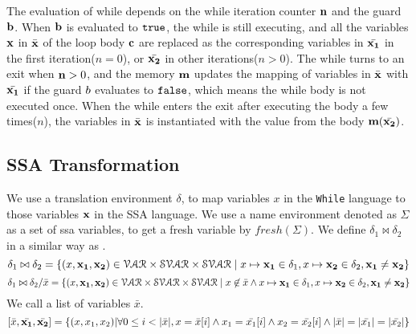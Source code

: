 \documentclass[a4paper,11pt]{article}
\begin{document}
{
	The evaluation of while depends on the while iteration counter $\boldsymbol{\mathbf{n}}$ and the guard $\boldsymbol{\mathbf{b}}$. 
	When $\boldsymbol{\mathbf{b}}$ is evaluated to $\mathtt{true}$, the while is still executing, and all the variables $\boldsymbol{\mathbf{x}}$ in $\bar{\boldsymbol{\mathbf{x}}}$ of the loop body $\boldsymbol{\mathbf{c}}$ are replaced as the corresponding variables in $\bar{\boldsymbol{\mathbf{x_1}}}$ in the first iteration($n=0$), or $\bar{\boldsymbol{\mathbf{x_2}}}$ in other iterations($n > 0$). 
	The while turns to an exit when $\boldsymbol{\mathbf{n}} > 0$, 
	and the memory $\boldsymbol{\mathbf{m}}$ updates the mapping of variables in $\bar{\boldsymbol{\mathbf{x}}}$ with $\bar{\boldsymbol{\mathbf{x_1}}}$ if the guard $b$ evaluates to $\mathtt{false}$, 
	which means the while body is not executed once. 
	When the while enters the exit after executing the body a few times($n$), the variables in $\bar{\boldsymbol{\mathbf{x}}}$ is instantiated with the value from the body $\boldsymbol{\mathbf{m}}(\bar{\boldsymbol{\mathbf{x_2}}})$. 
}
%
%
\subsection{SSA Transformation}
We use a translation environment $\delta$, to map variables $x$ in the {\tt While} language to those variables $\boldsymbol{\mathbf{x}}$ in the SSA language.
We use a name environment denoted as $\Sigma$ as a set of ssa variables, to get a fresh variable by $fresh(\Sigma)$. 
We define $\delta_1 \bowtie \delta_2 $ in a similar way as
\cite{vekris2016refinement}.
%
\[ 
\delta_1 \bowtie \delta_2 = \{ ( x, {\boldsymbol{\mathbf{x_1}}, \boldsymbol{\mathbf{x_2}}} ) \in 
\mathcal{VAR} \times \mathcal{SVAR} \times \mathcal{SVAR} \mid x \mapsto {\boldsymbol{\mathbf{x_1}}} \in \delta_1 , x \mapsto {\boldsymbol{\mathbf{x_2}} } \in \delta_2, {\boldsymbol{\mathbf{x_1}} \not= {\boldsymbol{\mathbf{x_2}} }  }  \} 
\]
%
\[ 
\delta_1 \bowtie \delta_2 / \bar{x} = \{ ( x, {\boldsymbol{\mathbf{x_1}}, \boldsymbol{\mathbf{x_2}}} ) \in 
\mathcal{VAR} \times \mathcal{SVAR} \times \mathcal{SVAR}
 \mid x \not\in \bar{x} \land x \mapsto {\boldsymbol{\mathbf{x_1}}} \in \delta_1 , x \mapsto {\boldsymbol{\mathbf{x_2}} } \in \delta_2, {\boldsymbol{\mathbf{x_1}} \not= {\boldsymbol{\mathbf{x_2}} }   }  \} 
 \]
We call a list of variables $\bar{x}$.
\[
 [\bar{x}, \bar{\boldsymbol{\mathbf{x_1}}}, \bar{\boldsymbol{\mathbf{x_2}}}] = \{ (x, x_1,x_2)  | \forall 0 \leq i < |\bar{x}|, x = \bar{x }[i] \land x_1 = \bar{x_1}[i] \land x_2 = \bar{x_2 }[i] \land |\bar{x}| = |\bar{x_1}| = |\bar{x_2}|   \}
\]
%
\end{document}
